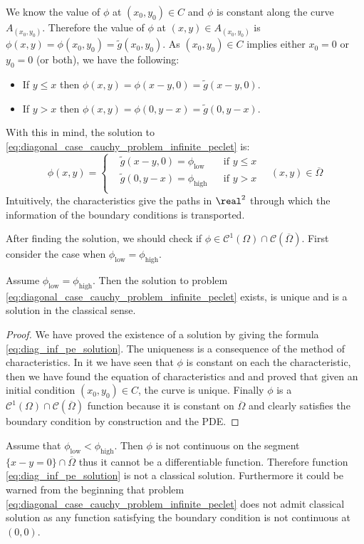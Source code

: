 We know the value of $\phi$ at $(x_0,y_0) \in C$ and $\phi$ is constant along
the curve $A_{(x_0,y_0)}$. Therefore the value of $\phi$ at $(x,y) \in
A_{(x_0,y_0)}$ is $\phi(x,y) = \phi(x_0,y_0) = \tilde{g}(x_0,y_0)$. As
$(x_0,y_0) \in C$ implies either $x_0 = 0$ or $y_0 = 0$ (or both), we have the following:
\begin{itemize}[topsep=0pt]
	\item If $y \leq x$ then $\phi(x,y) = \phi(x-y,0) = \tilde{g}(x-y,0)$.
	\item If $y > x$ then $\phi(x,y) = \phi(0,y-x) = \tilde{g}(0,y-x)$.
\end{itemize}
With this in mind, the solution to \eqref{eq:diagonal_case_cauchy_problem_infinite_peclet} is:
\begin{equation} \label{eq:diag_inf_pe_solution}
	\phi(x,y) = 
	\left\{
		\begin{aligned}
			&\tilde{g}(x-y,0) = \phi_\text{low} & &\text{if } y \leq x \\
			&\tilde{g}(0,y-x) = \phi_\text{high} & &\text{if } y > x \\
		\end{aligned}
	\right.
	\quad
	(x,y) \in \overline{\Omega}
\end{equation}
Intuitively, the characteristics give the paths in $\real^2$ through which the
information of the boundary conditions is transported. 

After finding the solution, we should check if $\phi \in \mathcal{C}^1(\Omega)
\cap \mathcal{C}(\overline{\Omega})$. First consider the case when
$\phi_\text{low} = \phi_\text{high}$.

\begin{theorem}
	Assume $\phi_\text{low} = \phi_\text{high}$. Then the solution to problem
	\eqref{eq:diagonal_case_cauchy_problem_infinite_peclet} exists, is unique
	and is a solution in the classical sense.
\end{theorem}
\begin{proof}
	We have proved the existence of a solution by giving the formula
	\eqref{eq:diag_inf_pe_solution}. The uniqueness is a consequence of the
	method of characteristics. In it we have seen that $\phi$ is constant on
	each the characteristic, then we have found the equation of characteristics
	and and proved that given an initial condition $(x_0,y_0) \in C$, the curve
	is unique. Finally $\phi$ is a $\mathcal{C}^1(\Omega) \cap
	\mathcal{C}(\overline{\Omega})$ function because it is constant on
	$\overline{\Omega}$ and clearly satisfies the boundary condition by
	construction and the PDE.
\end{proof}

Assume that $\phi_\text{low} < \phi_\text{high}$. Then $\phi$ is not continuous
on the segment $\{ x - y = 0 \} \cap \overline{\Omega}$ thus it cannot be a
differentiable function. Therefore function \eqref{eq:diag_inf_pe_solution} is
not a classical solution. Furthermore it could be warned from the beginning that
problem \eqref{eq:diagonal_case_cauchy_problem_infinite_peclet} does not admit
classical solution as any function satisfying the boundary condition is not
continuous at $(0,0)$.

